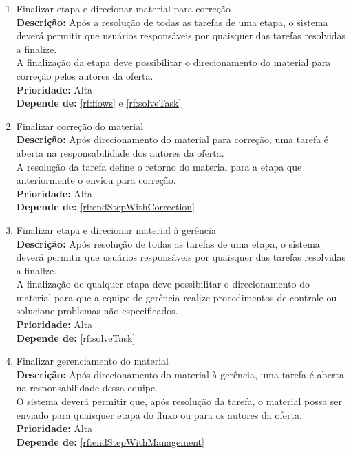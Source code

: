 \begin{enumerate}[label=\textbf{RF\protect\twodigits{\theenumi}}, leftmargin=2cm]
	\item \label{rf:endStepWithCorrection} Finalizar etapa e direcionar material para correção \\ 
		\textbf{Descrição:} Após a resolução de todas as tarefas de uma etapa, o sistema deverá permitir que usuários responsáveis por quaisquer das tarefas resolvidas a finalize. \\
		A finalização da etapa deve possibilitar o direcionamento do material para correção pelos autores da oferta. \\
		\textbf{Prioridade:} Alta \\
		\textbf{Depende de:} \hyperref[rf:flows]{\ref{rf:flows}} e \hyperref[rf:solveTask]{\ref{rf:solveTask}}

	\item \label{rf:endCorrection} Finalizar correção do material \\ 
		\textbf{Descrição:} Após direcionamento do material para correção, uma tarefa é aberta na responsabilidade dos autores da oferta. \\
		A resolução da tarefa define o retorno do material para a etapa que anteriormente o enviou para correção. \\
		\textbf{Prioridade:} Alta \\
		\textbf{Depende de:} \hyperref[rf:endStepWithCorrection]{\ref{rf:endStepWithCorrection}}

	\item \label{rf:endStepWithManagement} Finalizar etapa e direcionar material à gerência \\ 
		\textbf{Descrição:} Após resolução de todas as tarefas de uma etapa, o sistema deverá permitir que usuários responsáveis por quaisquer das tarefas resolvidas a finalize. \\
		A finalização de qualquer etapa deve possibilitar o direcionamento do material para que a equipe de gerência realize procedimentos de controle ou solucione problemas não especificados. \\
		\textbf{Prioridade:} Alta \\
		\textbf{Depende de:} \hyperref[rf:solveTask]{\ref{rf:solveTask}}

	\item \label{rf:endCorrection} Finalizar gerenciamento do material \\ 
		\textbf{Descrição:} Após direcionamento do material à gerência, uma tarefa é aberta na responsabilidade dessa equipe. \\
		O sistema deverá permitir que, após resolução da tarefa, o material possa ser enviado para quaisquer etapa do fluxo ou para os autores da oferta. \\
		\textbf{Prioridade:} Alta \\
		\textbf{Depende de:} \hyperref[rf:endStepWithManagement]{\ref{rf:endStepWithManagement}}


\end{enumerate}
